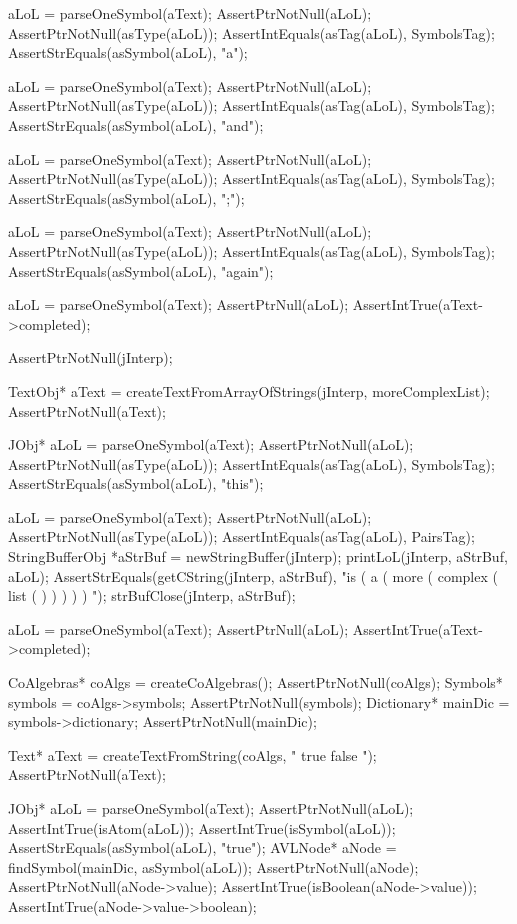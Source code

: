   aLoL = parseOneSymbol(aText);
  AssertPtrNotNull(aLoL);
  AssertPtrNotNull(asType(aLoL));
  AssertIntEquals(asTag(aLoL), SymbolsTag);
  AssertStrEquals(asSymbol(aLoL), "a");

  aLoL = parseOneSymbol(aText);
  AssertPtrNotNull(aLoL);
  AssertPtrNotNull(asType(aLoL));
  AssertIntEquals(asTag(aLoL), SymbolsTag);
  AssertStrEquals(asSymbol(aLoL), "and");

  aLoL = parseOneSymbol(aText);
  AssertPtrNotNull(aLoL);
  AssertPtrNotNull(asType(aLoL));
  AssertIntEquals(asTag(aLoL), SymbolsTag);
  AssertStrEquals(asSymbol(aLoL), ";");

  aLoL = parseOneSymbol(aText);
  AssertPtrNotNull(aLoL);
  AssertPtrNotNull(asType(aLoL));
  AssertIntEquals(asTag(aLoL), SymbolsTag);
  AssertStrEquals(asSymbol(aLoL), "again");

  aLoL = parseOneSymbol(aText);
  AssertPtrNull(aLoL);
  AssertIntTrue(aText->completed);
\stopCTest
\stopTestCase

\startCTest
  AssertPtrNotNull(jInterp);

  TextObj* aText = createTextFromArrayOfStrings(jInterp, moreComplexList);
  AssertPtrNotNull(aText);

  JObj* aLoL = parseOneSymbol(aText);
  AssertPtrNotNull(aLoL);
  AssertPtrNotNull(asType(aLoL));
  AssertIntEquals(asTag(aLoL), SymbolsTag);
  AssertStrEquals(asSymbol(aLoL), "this");

  aLoL = parseOneSymbol(aText);
  AssertPtrNotNull(aLoL);
  AssertPtrNotNull(asType(aLoL));
  AssertIntEquals(asTag(aLoL), PairsTag);
  StringBufferObj *aStrBuf = newStringBuffer(jInterp);
  printLoL(jInterp, aStrBuf, aLoL);
  AssertStrEquals(getCString(jInterp, aStrBuf),
    "is ( a ( more ( complex ( list ( ) ) ) ) ) ");
  strBufClose(jInterp, aStrBuf);

  aLoL = parseOneSymbol(aText);
  AssertPtrNull(aLoL);
  AssertIntTrue(aText->completed);
\stopCTest
\stopTestCase

\startCTest
  CoAlgebras* coAlgs = createCoAlgebras();
  AssertPtrNotNull(coAlgs);
  Symbols* symbols = coAlgs->symbols;
  AssertPtrNotNull(symbols);
  Dictionary* mainDic = symbols->dictionary;
  AssertPtrNotNull(mainDic);

  Text* aText = createTextFromString(coAlgs, " true false ");
  AssertPtrNotNull(aText);

  JObj* aLoL = parseOneSymbol(aText);
  AssertPtrNotNull(aLoL);
  AssertIntTrue(isAtom(aLoL));
  AssertIntTrue(isSymbol(aLoL));
  AssertStrEquals(asSymbol(aLoL), "true");
  AVLNode* aNode = findSymbol(mainDic, asSymbol(aLoL));
  AssertPtrNotNull(aNode);
  AssertPtrNotNull(aNode->value);
  AssertIntTrue(isBoolean(aNode->value));
  AssertIntTrue(aNode->value->boolean);

